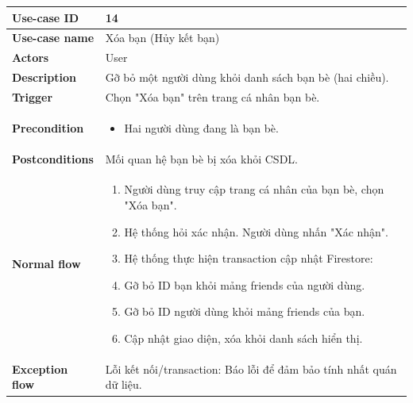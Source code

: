 \documentclass[a4paper, 12pt]{article}
\begin{document}
	\begin{longtable}{|p{3.5cm}|p{12cm}|}
		\hline
		\textbf{Use-case ID} & 14 \\
		\hline
		\textbf{Use-case name} & Xóa bạn (Hủy kết bạn) \\
		\hline
		\textbf{Actors} & User \\
		\hline
		\textbf{Description} & Gỡ bỏ một người dùng khỏi danh sách bạn bè (hai chiều). \\
		\hline
		\textbf{Trigger} & Chọn "Xóa bạn" trên trang cá nhân bạn bè. \\
		\hline
		\textbf{Precondition} & 
		\begin{itemize}[label=+]
			\item Hai người dùng đang là bạn bè.
		\end{itemize} \\
		\hline
		\textbf{Postconditions} & Mối quan hệ bạn bè bị xóa khỏi CSDL. \\
		\hline
		\textbf{Normal flow} & 
		\begin{enumerate}
			\item Người dùng truy cập trang cá nhân của bạn bè, chọn "Xóa bạn".
			\item Hệ thống hỏi xác nhận. Người dùng nhấn "Xác nhận".
			\item Hệ thống thực hiện transaction cập nhật Firestore:
			\item Gỡ bỏ ID bạn khỏi mảng friends của người dùng.
			\item Gỡ bỏ ID người dùng khỏi mảng friends của bạn.
			\item Cập nhật giao diện, xóa khỏi danh sách hiển thị.
		\end{enumerate} \\
		\hline
		\textbf{Exception flow} & Lỗi kết nối/transaction: Báo lỗi để đảm bảo tính nhất quán dữ liệu. \\
		\hline
	\end{longtable}
	\vspace{0.5cm}
	
\end{document}
